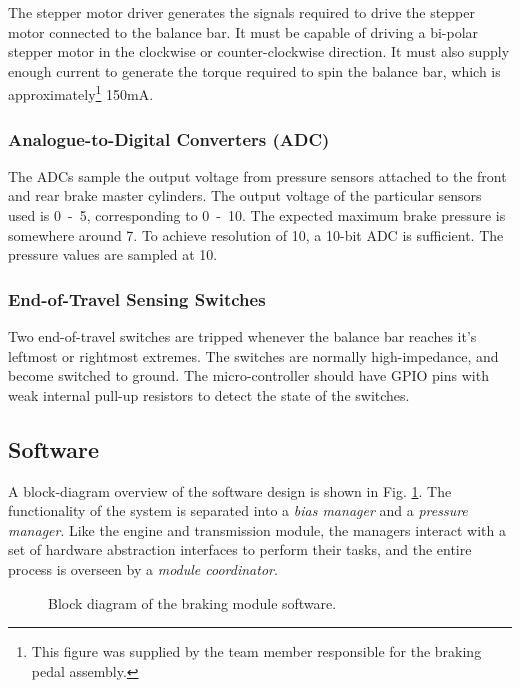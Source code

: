 The stepper motor driver generates the signals required to drive the stepper motor connected to the balance bar. It must be capable of  driving a bi-polar stepper motor in the clockwise or counter-clockwise direction. It must also supply enough current to generate the torque required to spin the balance bar, which is approximately\footnote{This figure was supplied by the team member responsible for the braking pedal assembly.} \unit{150}{mA}.

\subsubsection{Analogue-to-Digital Converters (ADC)}

The ADCs sample the output voltage from pressure sensors attached to the front and rear brake master cylinders. The output voltage of the particular sensors used is \unit{0-5}{\volt}, corresponding to \unit{0-10}{\mega\pascal}. The expected maximum brake pressure is somewhere around \unit{7}{\mega\pascal}. To achieve resolution of \unit{10}{\kilo\pascal}, a 10-bit ADC is sufficient. The pressure values are sampled at \unit{10}{\hertz}.

\subsubsection{End-of-Travel Sensing Switches}

Two end-of-travel switches are tripped whenever the balance bar reaches it's leftmost or rightmost extremes. The switches are normally high-impedance, and become switched to ground. The micro-controller should have GPIO pins with weak internal pull-up resistors to detect the state of the switches.

\subsection{Software}

A block-diagram overview of the software design is shown in Fig. \ref{fig:brake_software_design_block}. The functionality of the system is separated into a \emph{bias manager} and a \emph{pressure manager}. Like the engine and transmission module, the managers interact with a set of hardware abstraction interfaces to perform their tasks, and the entire process is overseen by a \emph{module coordinator}.

\begin{figure}[H]
	\centering
	
	\caption{Block diagram of the braking module software.}
	\label{fig:brake_software_design_block}
\end{figure}

